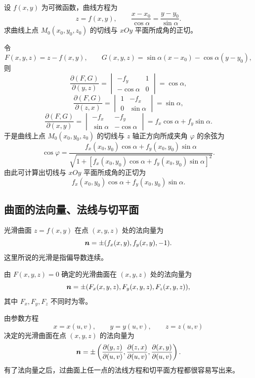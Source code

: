 \begin{xexample}[21.1.1]
设 $f(x,y)$ 为可微函数，曲线方程为
\[
  z=f(x,y),\qquad \frac{x-x_0}{\cos\alpha}=\frac{y-y_0}{\sin\alpha}.
\]
求曲线上点 $M_0(x_0,y_0,z_0)$ 的切线与 $xOy$ 平面所成角的正切。
\end{xexample}
\begin{xsolution}
令
\[
  F(x,y,z)=z-f(x,y),\qquad
  G(x,y,z)=\sin\alpha(x-x_0)-\cos\alpha(y-y_0),
\]
则
\[
  \frac{\partial(F,G)}{\partial(y,z)}
  =\begin{vmatrix}-f_y&1\\-\cos\alpha&0\end{vmatrix}
  =\cos\alpha,
\]
\[
  \frac{\partial(F,G)}{\partial(z,x)}
  =\begin{vmatrix}1&-f_x\\0&\sin\alpha\end{vmatrix}
  =\sin\alpha,
\]
\[
  \frac{\partial(F,G)}{\partial(x,y)}
  =\begin{vmatrix}-f_x&-f_y\\\sin\alpha&-\cos\alpha\end{vmatrix}
  =f_x\cos\alpha+f_y\sin\alpha.
\]
于是曲线上点 $M_0(x_0,y_0,z_0)$ 的切线与 $z$ 轴正方向所成夹角 $\varphi$ 的余弦为
\[
  \cos\varphi=
  \frac{f_x(x_0,y_0)\cos\alpha+f_y(x_0,y_0)\sin\alpha}
  {\sqrt{1+[f_x(x_0,y_0)\cos\alpha+f_y(x_0,y_0)\sin\alpha]^2}}.
\]
由此可计算出切线与 $xOy$ 平面所成角的正切为
\[
  f_x(x_0,y_0)\cos\alpha+f_y(x_0,y_0)\sin\alpha.
\]
\end{xsolution}

\subsection{曲面的法向量、法线与切平面}

光滑曲面 $z=f(x,y)$ 在点 $(x,y,z)$ 处的法向量为
\[
  \bm{n}=\pm(f_x(x,y),f_y(x,y),-1).
\]
这里所说的光滑是指偏导数连续。

由 $F(x,y,z)=0$ 确定的光滑曲面在 $(x,y,z)$ 处的法向量为
\[
  \bm{n}=\pm(F_x(x,y,z),F_y(x,y,z),F_z(x,y,z)),
\]
其中 $F_x,F_y,F_z$ 不同时为零。

由参数方程
\[
  x=x(u,v),\qquad y=y(u,v),\qquad z=z(u,v)
\]
决定的光滑曲面在点 $(x,y,z)$ 的法向量为
\[
  \bm{n}=\pm\left(
  \frac{\partial(y,z)}{\partial(u,v)},
  \frac{\partial(z,x)}{\partial(u,v)},
  \frac{\partial(x,y)}{\partial(u,v)}
  \right).
\]
有了法向量之后，过曲面上任一点的法线方程和切平面方程都很容易写出来。

